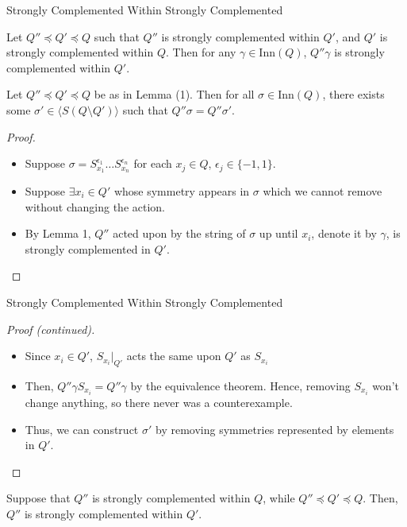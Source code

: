\documentclass[10pt]{beamer}
\newcommand{\sq}{\preccurlyeq} %
\newcommand{\Inn}{\mathrm{Inn}} %
\theoremstyle{plain}
\begin{document}
\begin{frame}{Strongly Complemented Within Strongly Complemented}


\begin{lemma}[1]
Let $Q''\sq Q' \sq Q$ such that $Q''$ is strongly complemented within $Q'$, and $Q'$ is strongly complemented within $Q$. Then for any $\gamma\in \Inn(Q)$, $Q''\gamma$ is strongly complemented within $Q'$.
\end{lemma}
\pause
\begin{lemma}[2]
Let $Q''\sq Q' \sq Q$ be as in Lemma (1). Then for all $\sigma\in \Inn(Q)$, there exists some $\sigma'\in \langle S(Q\setminus Q')\rangle$ such that $Q''\sigma = Q''\sigma'$.
\end{lemma}
\begin{proof}
\begin{itemize}
    \item Suppose $\sigma = S_{x_1}^{\epsilon_1}\dots S_{x_n}^{\epsilon_n}$ for each $x_j\in Q$, $\epsilon_j \in \{-1,1\}$.
    \item Suppose $\exists x_i \in Q'$ whose symmetry appears in $\sigma$ which we cannot remove without changing the action.
    \item By Lemma 1, $Q''$ acted upon by the string of $\sigma$ up until $x_i$, denote it by $\gamma$, is strongly complemented in $Q'$.
\end{itemize}
\end{proof}
\end{frame}

\begin{frame}{Strongly Complemented Within Strongly Complemented}

\begin{proof}[Proof (\textit{continued})]

\begin{itemize}
    \item Since $x_i\in Q'$, $S_{x_i}|_{Q'}$ acts the same upon $Q'$ as $S_{x_i}$
    \item Then, $Q''\gamma S_{x_i} = Q''\gamma$ by the equivalence theorem. Hence, removing $S_{x_i}$ won't change anything, so there never was a counterexample.
    \item Thus, we can construct $\sigma'$ by removing symmetries represented by elements in $Q'$.
\end{itemize}
 
\end{proof}


\begin{lemma}[3]

Suppose that $Q''$ is strongly complemented within $Q$, while $Q''\sq Q'\sq Q$. Then, $Q''$ is strongly complemented within $Q'$.

\end{lemma}

\end{frame}
\end{document}

